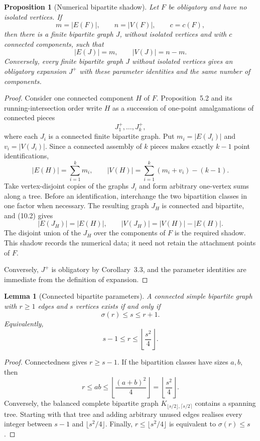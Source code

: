 \documentclass[a4paper,11pt,reqno]{amsart}
\theoremstyle{plain}
\newtheorem{lemma}[theorem]{Lemma}
\newtheorem{proposition}[theorem]{Proposition}
\theoremstyle{definition}
\theoremstyle{remark}
\begin{document}
\begin{proposition}[Numerical bipartite shadow]\label{proposition-10.1-numerical-bipartite-shadow}
Let $F$ be obligatory and have no isolated vertices.  If
\[
m=|E(F)|,\qquad n=|V(F)|,\qquad c=c(F),
\]
then there is a finite bipartite graph $J$, without isolated vertices and with
$c$ connected components, such that
\[
|E(J)|=m,
\qquad
|V(J)|=n-m.
\tag{10.1}
\]
Conversely, every finite bipartite graph $J$ without isolated vertices gives an
obligatory expansion $J^+$ with these parameter identities and the same number
of components.
\end{proposition}

\begin{proof}
Consider one connected component $H$ of $F$.  Proposition~5.2 and its
running-intersection order write $H$ as a succession of one-point
amalgamations of connected pieces
\[
J_1^+,\ldots,J_k^+,
\]
where each $J_i$ is a connected finite bipartite graph.  Put
$m_i=|E(J_i)|$ and $v_i=|V(J_i)|$.  Since a connected assembly of $k$ pieces
makes exactly $k-1$ point identifications,
\[
|E(H)|=\sum_{i=1}^k m_i,
\qquad
|V(H)|=\sum_{i=1}^k(m_i+v_i)-(k-1).
\tag{10.2}
\]
Take vertex-disjoint copies of the graphs $J_i$ and form arbitrary one-vertex
sums along a tree.  Before an identification, interchange the two bipartition
classes in one factor when necessary.  The resulting graph $J_H$ is connected
and bipartite, and (10.2) gives
\[
|E(J_H)|=|E(H)|,
\qquad
|V(J_H)|=|V(H)|-|E(H)|.
\]
The disjoint union of the $J_H$ over the components of $F$ is the required
shadow.  This shadow records the numerical data; it need not retain the
attachment points of $F$.

Conversely, $J^+$ is obligatory by Corollary~3.3, and the parameter identities
are immediate from the definition of expansion.
\end{proof}

\begin{lemma}[Connected bipartite parameters]\label{lemma-10.2-connected-bipartite-parameters}
A connected simple bipartite graph with $r\ge1$ edges and $s$ vertices exists
if and only if
\[
\sigma(r)\le s\le r+1.
\tag{10.3}
\]
Equivalently,
\[
s-1\le r\le\left\lfloor\frac{s^2}{4}\right\rfloor.
\tag{10.4}
\]
\end{lemma}

\begin{proof}
Connectedness gives $r\ge s-1$.  If the bipartition classes have sizes $a,b$,
then
\[
r\le ab\le\left\lfloor\frac{(a+b)^2}{4}\right\rfloor
=\left\lfloor\frac{s^2}{4}\right\rfloor.
\]
Conversely, the balanced complete bipartite graph
$K_{\lfloor s/2\rfloor,\lceil s/2\rceil}$ contains a spanning tree.  Starting
with that tree and adding arbitrary unused edges realises every integer between
$s-1$ and $\lfloor s^2/4\rfloor$.  Finally,
$r\le\lfloor s^2/4\rfloor$ is equivalent to $\sigma(r)\le s$.
\end{proof}
\end{document}
